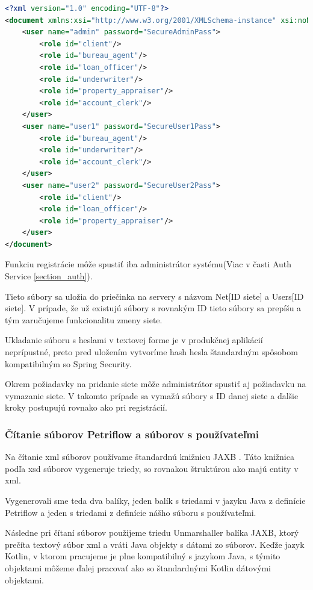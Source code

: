 \begin{lstlisting}[float, caption={Príklad súboru s používateľmi},label={alg:example_users},language=XML]
<?xml version="1.0" encoding="UTF-8"?>
<document xmlns:xsi="http://www.w3.org/2001/XMLSchema-instance" xsi:noNamespaceSchemaLocation="./users_schema.xsd">
	<user name="admin" password="SecureAdminPass">
		<role id="client"/>
		<role id="bureau_agent"/>
		<role id="loan_officer"/>
		<role id="underwriter"/>
		<role id="property_appraiser"/>
		<role id="account_clerk"/>
	</user>
	<user name="user1" password="SecureUser1Pass">
		<role id="bureau_agent"/>
		<role id="underwriter"/>
		<role id="account_clerk"/>
	</user>
	<user name="user2" password="SecureUser2Pass">
		<role id="client"/>
		<role id="loan_officer"/>
		<role id="property_appraiser"/>
	</user>
</document>
\end{lstlisting}

Funkciu registrácie môže spustiť iba administrátor systému(Viac v časti Auth Service \ref{section_auth}).

Tieto súbory sa uložia do priečinka na servery s názvom Net[ID siete] a Users[ID siete]. V prípade, že už existujú súbory s rovnakým ID tieto súbory sa prepíšu a tým zaručujeme funkcionalitu zmeny siete.

Ukladanie súboru s heslami v textovej forme je v produkčnej aplikácií neprípustné, preto pred uložením vytvoríme hash hesla štandardným spôsobom kompatibilným so Spring Security.

Okrem požiadavky na pridanie siete môže administrátor spustiť aj požiadavku na vymazanie siete. V takomto prípade sa vymažú súbory s ID danej siete a ďalšie kroky postupujú rovnako ako pri registrácií.

\subsubsection{Čítanie súborov Petriflow a súborov s používateľmi}
Na čítanie \acrshort{xml} súborov používame štandardnú knižnicu JAXB \cite{jaxb}. Táto knižnica podľa \acrshort{xsd} súborov vygeneruje triedy, so rovnakou štruktúrou ako majú entity v \acrshort{xml}.

Vygenerovali sme teda dva balíky, jeden balík s triedami v jazyku Java z definície Petriflow a jeden s triedami z definície nášho súboru s používateľmi.

Následne pri čítaní súborov použijeme triedu Unmarshaller balíka JAXB, ktorý prečíta textový súbor \acrshort{xml} a vráti Java objekty s dátami zo súborov. Keďže jazyk Kotlin, v ktorom pracujeme je plne kompatibilný s jazykom Java, s týmito objektami môžeme ďalej pracovať ako so štandardnými Kotlin dátovými objektami.

